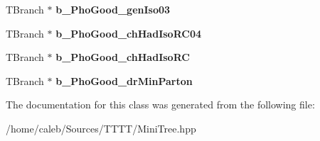 \begin{DoxyCompactItemize}
\hypertarget{classMiniTree_ac9352fe79e1e23dd60b01a63f40923d2}{}\label{classMiniTree_ac9352fe79e1e23dd60b01a63f40923d2} 
T\+Branch $\ast$ {\bfseries b\+\_\+\+Pho\+Good\+\_\+gen\+Iso03}
\item 
\hypertarget{classMiniTree_aee0d645e763da1f08d632a598495fac8}{}\label{classMiniTree_aee0d645e763da1f08d632a598495fac8} 
T\+Branch $\ast$ {\bfseries b\+\_\+\+Pho\+Good\+\_\+ch\+Had\+Iso\+R\+C04}
\item 
\hypertarget{classMiniTree_a14cbf00465b8b7d603cb35fce0fe2bf7}{}\label{classMiniTree_a14cbf00465b8b7d603cb35fce0fe2bf7} 
T\+Branch $\ast$ {\bfseries b\+\_\+\+Pho\+Good\+\_\+ch\+Had\+Iso\+RC}
\item 
\hypertarget{classMiniTree_a9453d57eebeda212db223cd342827b7e}{}\label{classMiniTree_a9453d57eebeda212db223cd342827b7e} 
T\+Branch $\ast$ {\bfseries b\+\_\+\+Pho\+Good\+\_\+dr\+Min\+Parton}
\end{DoxyCompactItemize}


The documentation for this class was generated from the following file\+:\begin{DoxyCompactItemize}
\item 
/home/caleb/\+Sources/\+T\+T\+T\+T/Mini\+Tree.\+hpp\end{DoxyCompactItemize}
